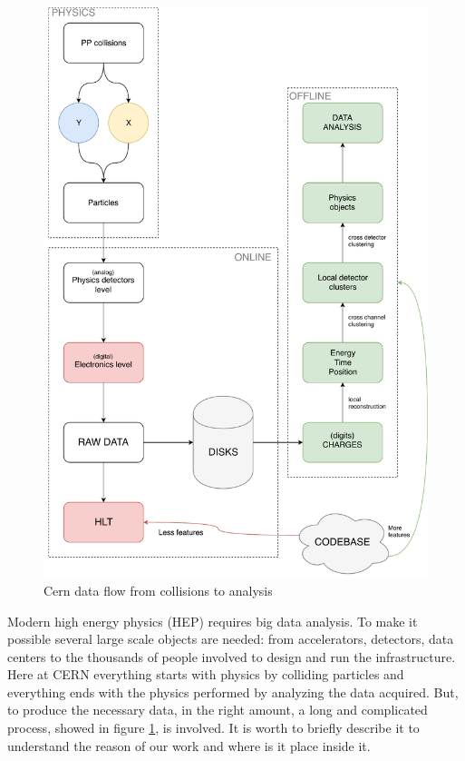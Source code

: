 \begin{figure}[ht]
  \includegraphics[height=\textheight]{img/dataflow}
  \caption{Cern data flow from collisions to analysis}
  \label{img:dataflow}
\end{figure}
Modern high energy physics (HEP) requires big data analysis. To make it possible several large scale objects are needed: from accelerators, detectors, data centers to the thousands of people involved to design and run the infrastructure. Here at CERN everything starts with physics by colliding particles and everything ends with the physics performed by analyzing the data acquired. But, to produce the necessary data, in the right amount, a long and complicated process, showed in figure \ref{img:dataflow}, is involved. It is worth to briefly describe it to understand the reason of our work and where is it place inside it. \\
